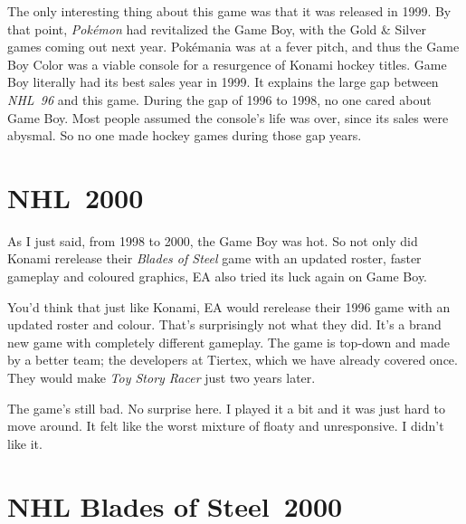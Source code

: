 \documentclass{book}
\let\oldcenter\center
\let\oldendcenter\endcenter
\renewenvironment{center}{\setlength\topsep{0pt}\oldcenter}{\oldendcenter}
\begin{document}
The only interesting thing about this game was that it was released in 1999. By that point, \emph{Pokémon} had revitalized the Game Boy, with the Gold \& Silver games coming out next year. Pokémania was at a fever pitch, and thus the Game Boy Color was a viable console for a resurgence of Konami hockey titles. Game Boy literally had its best sales year in 1999. It explains the large gap between \emph{NHL~96} and this game. During the gap of 1996 to 1998, no one cared about Game Boy. Most people assumed the console’s life was over, since its sales were abysmal. So no one made hockey games during those gap years.

\FloatBarrier\needspace{10mm}\section*{NHL~2000}\nopagebreak[4]

\begin{center}
\quad\vspace{4pt}
\quad\vspace{4pt}
\end{center}

As I just said, from 1998 to 2000, the Game Boy was hot. So not only did Konami rerelease their \emph{Blades of Steel} game with an updated roster, faster gameplay and coloured graphics, EA also tried its luck again on Game Boy.

You’d think that just like Konami, EA would rerelease their 1996 game with an updated roster and colour. That’s surprisingly not what they did. It’s a brand new game with completely different gameplay. The game is top-down and made by a better team; the developers at Tiertex, which we have already covered once. They would make \emph{Toy Story Racer} just two years later.

The game’s still bad. No surprise here. I played it a bit and it was just hard to move around. It felt like the worst mixture of floaty and unresponsive. I didn’t like it.

\FloatBarrier\needspace{10mm}\section*{NHL Blades of Steel~2000}\nopagebreak[4]

\begin{center}
\quad\vspace{4pt}
\quad\vspace{4pt}
\end{center}
\end{document}
